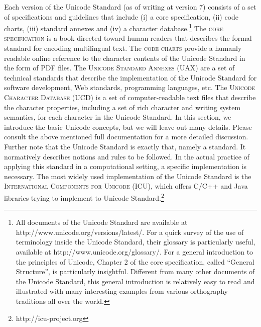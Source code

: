 Each version of the Unicode Standard (as of writing at version 7) consists of a set of specifications and guidelines that include (i) a core specification, (ii) code charts, (iii) standard annexes and (iv) a character database.\footnote{All documents of the Unicode Standard are available at http://www.unicode.org/versions/latest/. For a quick survey of the use of terminology inside the Unicode Standard, their glossary is particularly useful, available at http://www.unicode.org/glossary/. For a general introduction to the principles of Unicode, Chapter 2 of the core specification, called ``General Structure'', is particularly insightful. Different from many other documents of the Unicode Standard, this general introduction is relatively easy to read and illustrated with many interesting examples from various orthography traditions all over the world.} The \textsc{core specification} is a book directed toward human readers that describes the formal standard for encoding multilingual text. The \textsc{code charts} provide a humanly readable online reference to the character contents of the Unicode Standard in the form of PDF files. The \textsc{Unicode Standard Annexes (UAX)} are a set of technical standards that describe the implementation of the Unicode Standard for software development, Web standards, programming languages, etc. The \textsc{Unicode Character Database (UCD)} is a set of computer-readable text files that describe the character properties, including a set of rich character and writing system semantics, for each character in the Unicode Standard. In this section, we introduce the basic Unicode concepts, but we will leave out many details. Please consult the above mentioned full documentation for a more detailed discussion. Further note that the Unicode Standard is exactly that, namely a standard. It normatively describes notions and rules to be followed. In the actual practice of applying this standard in a computational setting, a specific implementation is necessary. The most widely used implementation of the Unicode Standard is the \textsc{International Components for Unicode (ICU)}, which offers C/C++ and Java libraries trying to implement to Unicode Standard.\footnote{http://icu-project.org}

